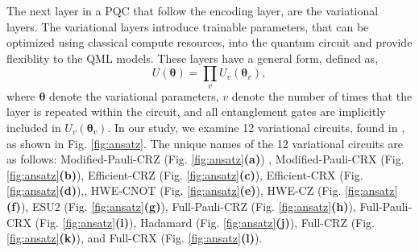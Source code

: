 \documentclass[journal=jacsat,manuscript=article]{achemso}
\begin{document}
The next layer in a PQC that follow the encoding layer, are the variational layers.
The variational layers introduce trainable parameters, that can be optimized using classical compute resources, into the quantum circuit and provide flexiblity to the QML models.
These layers have a general form, defined as,
\begin{equation}
	U(\bm{\theta}) = \prod_{v} U_{v}(\bm{\theta}_{v}), %
	\label{eq:general_variational}
\end{equation}
where $\bm{\theta}$ denote the variational parameters, $v$ denote the number of times that the layer is repeated within the circuit, and all entanglement gates are implicitly included in $U_{v}(\bm{\theta}_{v})$.
In our study, we examine 12 variational circuits, found in \cite{sim_expressibility_2019}, as shown in Fig. \ref{fig:ansatz}.
The unique names of the 12 variational circuits are as follows: Modified-Pauli-CRZ (Fig. \ref{fig:ansatz}\textbf{(a)}) , Modified-Pauli-CRX (Fig. \ref{fig:ansatz}\textbf{(b)}), Efficient-CRZ (Fig. \ref{fig:ansatz}\textbf{(c)}), Efficient-CRX (Fig. \ref{fig:ansatz}\textbf{(d)}),, HWE-CNOT (Fig. \ref{fig:ansatz}\textbf{(e)}), HWE-CZ (Fig. \ref{fig:ansatz}\textbf{(f)}), ESU2 (Fig. \ref{fig:ansatz}\textbf{(g)}), Full-Pauli-CRZ (Fig. \ref{fig:ansatz}\textbf{(h)}), Full-Pauli-CRX (Fig. \ref{fig:ansatz}\textbf{(i)}), Hadamard (Fig. \ref{fig:ansatz}\textbf{(j)}), Full-CRZ (Fig. \ref{fig:ansatz}\textbf{(k)}), and Full-CRX (Fig. \ref{fig:ansatz}\textbf{(l)}).
\end{document}
